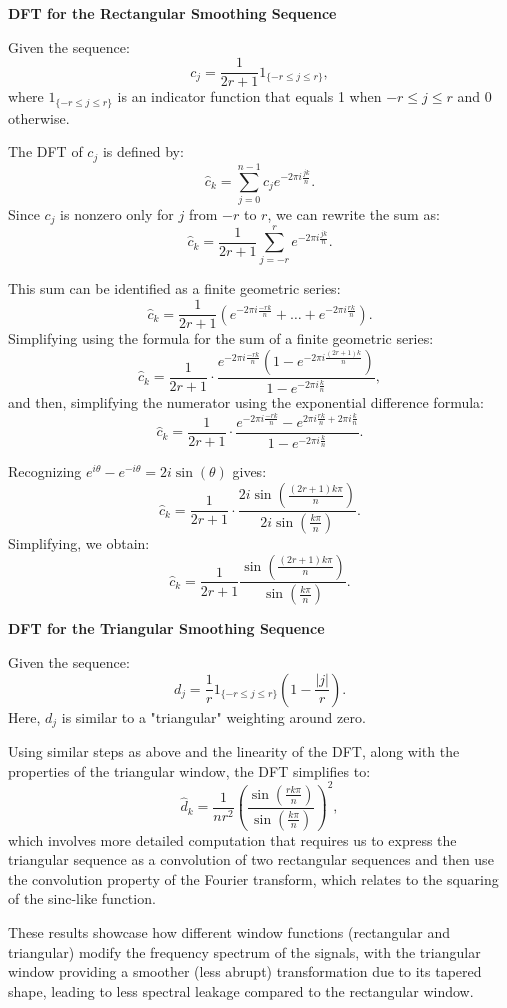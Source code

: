 \documentclass[8pt]{article}
\begin{document}
\textbf{DFT for the Rectangular Smoothing Sequence}

Given the sequence:
\[ c_j = \frac{1}{2r+1} 1_{\{-r \leq j \leq r\}}, \]
where \(1_{\{-r \leq j \leq r\}}\) is an indicator function that equals 1 when \(-r \leq j \leq r\) and 0 otherwise.

The DFT of \(c_j\) is defined by:
\[ \hat{c}_k = \sum_{j=0}^{n-1} c_j e^{-2\pi i \frac{jk}{n}}. \]
Since \(c_j\) is nonzero only for \(j\) from \(-r\) to \(r\), we can rewrite the sum as:
\[ \hat{c}_k = \frac{1}{2r+1} \sum_{j=-r}^{r} e^{-2\pi i \frac{jk}{n}}. \]

This sum can be identified as a finite geometric series:
\[ \hat{c}_k = \frac{1}{2r+1} \left( e^{-2\pi i \frac{-rk}{n}} + \dots + e^{-2\pi i \frac{rk}{n}} \right). \]
Simplifying using the formula for the sum of a finite geometric series:
\[ \hat{c}_k = \frac{1}{2r+1} \cdot \frac{e^{-2\pi i \frac{-rk}{n}} (1 - e^{-2\pi i \frac{(2r+1)k}{n}})}{1 - e^{-2\pi i \frac{k}{n}}}, \]
and then, simplifying the numerator using the exponential difference formula:
\[ \hat{c}_k = \frac{1}{2r+1} \cdot \frac{e^{-2\pi i \frac{-rk}{n}} - e^{2\pi i \frac{rk}{n} + 2\pi i \frac{k}{n}}}{1 - e^{-2\pi i \frac{k}{n}}}. \]

Recognizing \( e^{i \theta} - e^{-i \theta} = 2i \sin(\theta) \) gives:
\[ \hat{c}_k = \frac{1}{2r+1} \cdot \frac{2i \sin \left(\frac{(2r+1)k\pi}{n}\right)}{2i \sin \left(\frac{k\pi}{n}\right)}. \]
Simplifying, we obtain:
\[ \hat{c}_k = \frac{1}{2r+1} \frac{\sin \left(\frac{(2r+1)k\pi}{n}\right)}{\sin \left(\frac{k\pi}{n}\right)}. \]

\textbf{DFT for the Triangular Smoothing Sequence}

Given the sequence:
\[ d_j = \frac{1}{r} 1_{\{-r \leq j \leq r\}} \left(1 - \frac{|j|}{r}\right). \]
Here, \(d_j\) is similar to a "triangular" weighting around zero.

Using similar steps as above and the linearity of the DFT, along with the properties of the triangular window, the DFT simplifies to:
\[ \hat{d}_k = \frac{1}{nr^2} \left(\frac{\sin \left(\frac{rk\pi}{n}\right)}{\sin \left(\frac{k\pi}{n}\right)}\right)^2, \]
which involves more detailed computation that requires us to express the triangular sequence as a convolution of two rectangular sequences and then use the convolution property of the Fourier transform, which relates to the squaring of the sinc-like function.

These results showcase how different window functions (rectangular and triangular) modify the frequency spectrum of the signals, with the triangular window providing a smoother (less abrupt) transformation due to its tapered shape, leading to less spectral leakage compared to the rectangular window.
\end{document}
